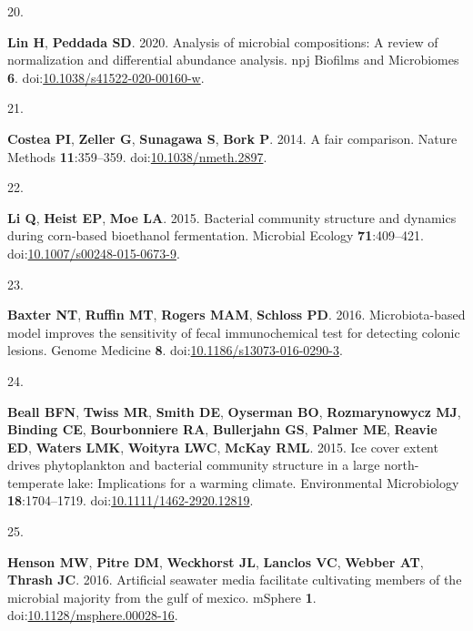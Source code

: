 \documentclass[
]{article}
\newlength{\cslhangindent}
\newlength{\csllabelwidth}
\newlength{\cslentryspacingunit} %
\newenvironment{CSLReferences}[2] %
 {%
  \setlength{\parindent}{0pt}
  \ifodd #1
  \let\oldpar\par
  \def\par{\hangindent=\cslhangindent\oldpar}
  \fi
  \setlength{\parskip}{#2\cslentryspacingunit}
 }%
 {}
\newcommand{\CSLLeftMargin}[1]{\parbox[t]{\csllabelwidth}{#1}}
\newcommand{\CSLRightInline}[1]{\parbox[t]{\linewidth - \csllabelwidth}{#1}\break}
\begin{document}
\begin{CSLReferences}{0}{1}
\leavevmode{}%
\CSLLeftMargin{20. }%
\CSLRightInline{\textbf{Lin H}, \textbf{Peddada SD}. 2020. Analysis of
microbial compositions: A review of normalization and differential
abundance analysis. npj Biofilms and Microbiomes \textbf{6}.
doi:\href{https://doi.org/10.1038/s41522-020-00160-w}{10.1038/s41522-020-00160-w}.}

\leavevmode{}%
\CSLLeftMargin{21. }%
\CSLRightInline{\textbf{Costea PI}, \textbf{Zeller G}, \textbf{Sunagawa
S}, \textbf{Bork P}. 2014. A fair comparison. Nature Methods
\textbf{11}:359--359.
doi:\href{https://doi.org/10.1038/nmeth.2897}{10.1038/nmeth.2897}.}

\leavevmode{}%
\CSLLeftMargin{22. }%
\CSLRightInline{\textbf{Li Q}, \textbf{Heist EP}, \textbf{Moe LA}. 2015.
Bacterial community structure and dynamics during corn-based bioethanol
fermentation. Microbial Ecology \textbf{71}:409--421.
doi:\href{https://doi.org/10.1007/s00248-015-0673-9}{10.1007/s00248-015-0673-9}.}

\leavevmode{}%
\CSLLeftMargin{23. }%
\CSLRightInline{\textbf{Baxter NT}, \textbf{Ruffin MT}, \textbf{Rogers
MAM}, \textbf{Schloss PD}. 2016. Microbiota-based model improves the
sensitivity of fecal immunochemical test for detecting colonic lesions.
Genome Medicine \textbf{8}.
doi:\href{https://doi.org/10.1186/s13073-016-0290-3}{10.1186/s13073-016-0290-3}.}

\leavevmode{}%
\CSLLeftMargin{24. }%
\CSLRightInline{\textbf{Beall BFN}, \textbf{Twiss MR}, \textbf{Smith
DE}, \textbf{Oyserman BO}, \textbf{Rozmarynowycz MJ}, \textbf{Binding
CE}, \textbf{Bourbonniere RA}, \textbf{Bullerjahn GS}, \textbf{Palmer
ME}, \textbf{Reavie ED}, \textbf{Waters LMK}, \textbf{Woityra LWC},
\textbf{McKay RML}. 2015. Ice cover extent drives phytoplankton and
bacterial community structure in a large north-temperate lake:
Implications for a warming climate. Environmental Microbiology
\textbf{18}:1704--1719.
doi:\href{https://doi.org/10.1111/1462-2920.12819}{10.1111/1462-2920.12819}.}

\leavevmode{}%
\CSLLeftMargin{25. }%
\CSLRightInline{\textbf{Henson MW}, \textbf{Pitre DM}, \textbf{Weckhorst
JL}, \textbf{Lanclos VC}, \textbf{Webber AT}, \textbf{Thrash JC}. 2016.
Artificial seawater media facilitate cultivating members of the
microbial majority from the gulf of mexico. {mSphere} \textbf{1}.
doi:\href{https://doi.org/10.1128/msphere.00028-16}{10.1128/msphere.00028-16}.}


\end{CSLReferences}
\end{document}
